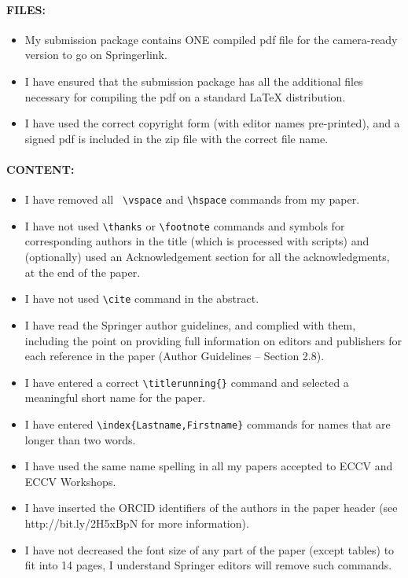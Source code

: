 \documentclass[runningheads]{llncs}
\begin{document}
\paragraph{FILES:}
\begin{itemize}
  \item My submission package contains ONE compiled pdf file for the camera-ready version to go on Springerlink.
  \item I have ensured that the submission package has all the additional files necessary for compiling the pdf on a standard LaTeX distribution.
  \item I have used the correct copyright form (with editor names pre-printed), and a signed pdf is included in the zip file with the correct file name.
\end{itemize}

\paragraph{CONTENT:}
\begin{itemize}
  \item I have removed all \verb| \vspace| and \verb|\hspace|  commands from my paper.
  \item I have not used \verb|\thanks|  or \verb|\footnote|  commands and symbols for corresponding authors in the title (which is processed with scripts) and (optionally) used an Acknowledgement section for all the acknowledgments, at the end of the paper.
  \item I have not used \verb|\cite| command in the abstract.
  \item I have read the Springer author guidelines, and complied with them, including the point on providing full information on editors and publishers for each reference in the paper (Author Guidelines – Section 2.8).
  \item I have entered a correct \verb|\titlerunning{}| command and selected a meaningful short name for the paper.
  \item I have entered \verb|\index{Lastname,Firstname}| commands for names that are longer than two words.
  \item I have used the same name spelling in all my papers accepted to ECCV and ECCV Workshops.
  \item I have inserted the ORCID identifiers of the authors in the paper header (see http://bit.ly/2H5xBpN for more information).
  \item I have not decreased the font size of any part of the paper (except tables) to fit into 14 pages, I understand Springer editors will remove such commands.
\end{itemize}
\end{document}
